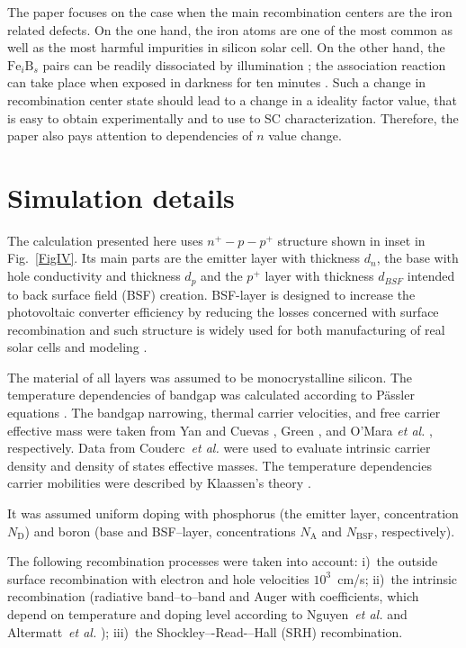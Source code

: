 \documentclass[12pt]{article}
\begin{document}
The paper focuses on the case when the main recombination centers are the iron related defects.
On the one hand, the iron atoms  are one of the most common as well as the most harmful impurities in silicon solar cell.
On the other hand, the $\mathrm{Fe}_i\mathrm{B}_s$ pairs can be readily dissociated by illumination \cite{FeB:Schmidt};
the association reaction can take place when exposed in darkness for ten minutes \cite{FeB:kinetic}.
Such a change in recombination center state should lead to a change in a ideality factor value,
that is easy to obtain experimentally and to use to SC characterization.
Therefore, the paper also pays attention to dependencies of $n$ value change.

\section{Simulation details}

The calculation presented here uses $n^+-p-p^+$ structure shown in inset in Fig.~\ref{FigIV}.
Its main parts are the emitter layer with thickness $d_n$, the base with hole conductivity and thickness $d_p$
and the $p^+$ layer with thickness $d_{BSF}$ intended to back surface field (BSF) creation.
BSF-layer is designed to increase the photovoltaic converter efficiency by reducing the losses concerned with surface recombination
and such structure is widely used for both manufacturing of real solar cells and modeling \cite{SCAPSuseSi4,SCAPSuseSi1,SCAPSuseSi5}.

The material of all layers was assumed to be monocrystalline silicon.
The temperature dependencies of bandgap was calculated according to P\"assler equations \cite{Pasler}.
The bandgap narrowing, thermal carrier velocities,
and  free carrier effective mass
were taken from Yan and Cuevas \cite{EgNarrow}, Green \cite{Nc:Green}, and O'Mara \emph{et al.} \cite{OMara}, respectively.
Data from Couderc~\emph{et al.} \cite{Si_ni_Couderc} were used to evaluate intrinsic carrier density and density of states effective masses.
The temperature dependencies carrier mobilities were described by Klaassen's theory \cite{KLAASSEN953,Hull}.

It was assumed uniform doping with phosphorus (the emitter layer, concentration $N_\mathrm{D}$)
and boron (base and BSF--layer, concentrations $N_\mathrm{A}$ and $N_\mathrm{BSF}$, respectively).

The following recombination processes were taken into account:
i)~the outside surface recombination with electron and hole velocities $10^3$~cm/s;
ii)~the intrinsic recombination (radiative band--to--band and Auger with coefficients,
which depend on temperature and doping level according
to Nguyen~\emph{et al.} \cite{Si_BtB} and Altermatt~\emph{et al.} \cite{Si_Auger});
iii)~the Shockley–-Read-–Hall (SRH) recombination.
\end{document}
